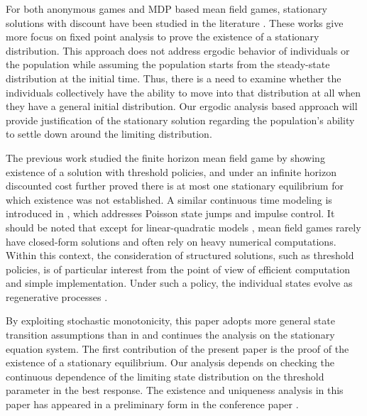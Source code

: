 \documentclass[graybox]{svmult}
\begin{document}
For both anonymous games and MDP based mean field games, stationary solutions with discount have been studied in the literature \cite{AJW15,JR88}.  These works give more focus on fixed point analysis to prove the existence of a stationary distribution. This approach does not address ergodic behavior of individuals or the population while assuming the  population starts from the steady-state distribution at the initial time. Thus, there is a need to examine whether the individuals collectively have the ability to move into that distribution at all when they have a general initial distribution.
    Our  ergodic analysis based approach will provide justification of the stationary solution regarding the population's ability to settle down around the limiting distribution.

The previous work \cite{HM16Chen, HM17} studied the finite horizon mean field game by showing existence of a solution with threshold policies, and  under an infinite horizon discounted cost further proved there is at most one stationary equilibrium for which existence was not established.
A similar continuous time modeling is introduced in \cite{ZH17}, which addresses Poisson state jumps and impulse control. It should be noted that except for linear-quadratic models \cite{B12,HCM07,HZ18,LZ08,MB17}, mean field games rarely have
closed-form solutions and often rely on heavy numerical computations. Within this context, the consideration of structured solutions, such as threshold policies, is of particular interest  from the point of view of efficient computation and simple implementation. Under such a policy, the individual states evolve as regenerative processes \cite{A03,SW93}.


By exploiting stochastic monotonicity, this paper adopts more  general state transition assumptions than in \cite{HM16Chen, HM17} and continues the analysis on
 the stationary equation
 system. The first contribution of the present paper is the proof of the existence of a stationary equilibrium. Our analysis depends on checking the continuous dependence of the limiting state distribution on the threshold parameter in the  best response.
The existence and uniqueness analysis in this paper has appeared in a preliminary form in the conference paper \cite{HMcdc17}.
\end{document}
